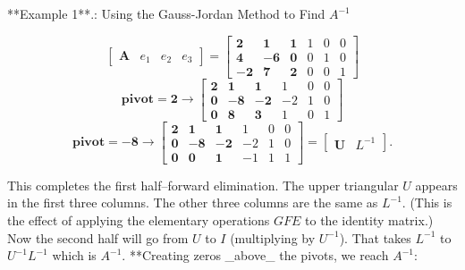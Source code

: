 

**Example 1**.: Using the Gauss-Jordan Method to Find \(A^{-1}\)

\[\begin{bmatrix}\boldsymbol{A}&e_{1}&e_{2}&e_{3}\end{bmatrix}=\begin{bmatrix} \boldsymbol{2}&\boldsymbol{1}&\boldsymbol{1}&1&0&0\\ \boldsymbol{4}&-\boldsymbol{6}&\boldsymbol{0}&0&1&0\\ -\boldsymbol{2}&\boldsymbol{7}&\boldsymbol{2}&0&0&1\end{bmatrix}\] \[\mathbf{pivot}=\boldsymbol{2}\to\begin{bmatrix}\boldsymbol{2}& \boldsymbol{1}&\boldsymbol{1}&1&0&0\\ \boldsymbol{0}&-\boldsymbol{8}&-\boldsymbol{2}&-2&1&0\\ \boldsymbol{0}&\boldsymbol{8}&\boldsymbol{3}&1&0&1\end{bmatrix}\] \[\mathbf{pivot}=-\boldsymbol{8}\to\begin{bmatrix}\boldsymbol{2}& \boldsymbol{1}&\boldsymbol{1}&1&0&0\\ \boldsymbol{0}&-\boldsymbol{8}&-\boldsymbol{2}&-2&1&0\\ \boldsymbol{0}&\boldsymbol{0}&\boldsymbol{1}&-1&1&1\end{bmatrix}=\begin{bmatrix} \boldsymbol{U}&L^{-1}\end{bmatrix}.\]

This completes the first half--forward elimination. The upper triangular \(U\) appears in the first three columns. The other three columns are the same as \(L^{-1}\). (This is the effect of applying the elementary operations \(GFE\) to the identity matrix.) Now the second half will go from \(U\) to \(I\) (multiplying by \(U^{-1}\)). That takes \(L^{-1}\) to \(U^{-1}L^{-1}\) which is \(A^{-1}\). **Creating zeros _above_ the pivots, we reach \(A^{-1}\):


